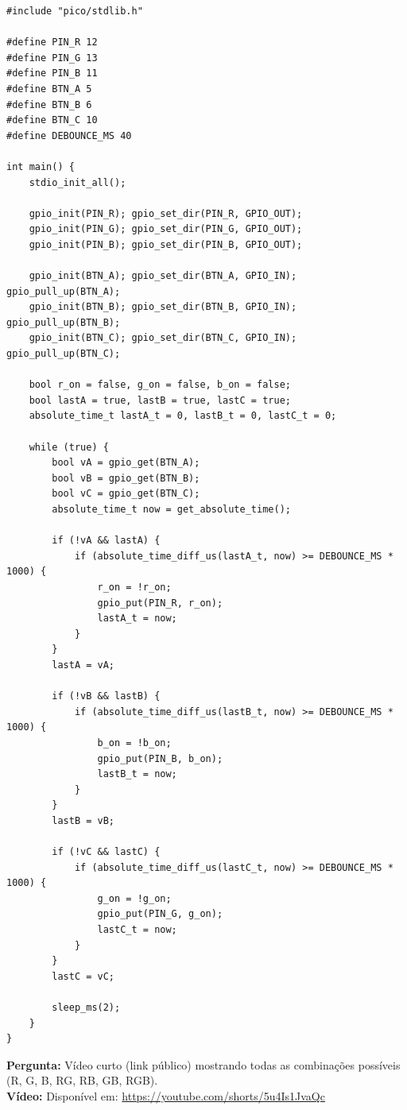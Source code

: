 \documentclass{article}
\begin{document}
\begin{lstlisting}[caption={Controle de LEDs com botões no Raspberry Pi Pico}]
#include "pico/stdlib.h"

#define PIN_R 12
#define PIN_G 13
#define PIN_B 11
#define BTN_A 5
#define BTN_B 6
#define BTN_C 10
#define DEBOUNCE_MS 40

int main() {
    stdio_init_all();

    gpio_init(PIN_R); gpio_set_dir(PIN_R, GPIO_OUT);
    gpio_init(PIN_G); gpio_set_dir(PIN_G, GPIO_OUT);
    gpio_init(PIN_B); gpio_set_dir(PIN_B, GPIO_OUT);

    gpio_init(BTN_A); gpio_set_dir(BTN_A, GPIO_IN); gpio_pull_up(BTN_A);
    gpio_init(BTN_B); gpio_set_dir(BTN_B, GPIO_IN); gpio_pull_up(BTN_B);
    gpio_init(BTN_C); gpio_set_dir(BTN_C, GPIO_IN); gpio_pull_up(BTN_C);

    bool r_on = false, g_on = false, b_on = false;
    bool lastA = true, lastB = true, lastC = true;
    absolute_time_t lastA_t = 0, lastB_t = 0, lastC_t = 0;

    while (true) {
        bool vA = gpio_get(BTN_A);
        bool vB = gpio_get(BTN_B);
        bool vC = gpio_get(BTN_C);
        absolute_time_t now = get_absolute_time();

        if (!vA && lastA) {
            if (absolute_time_diff_us(lastA_t, now) >= DEBOUNCE_MS * 1000) {
                r_on = !r_on;
                gpio_put(PIN_R, r_on);
                lastA_t = now;
            }
        }
        lastA = vA;

        if (!vB && lastB) {
            if (absolute_time_diff_us(lastB_t, now) >= DEBOUNCE_MS * 1000) {
                b_on = !b_on;
                gpio_put(PIN_B, b_on);
                lastB_t = now;
            }
        }
        lastB = vB;

        if (!vC && lastC) {
            if (absolute_time_diff_us(lastC_t, now) >= DEBOUNCE_MS * 1000) {
                g_on = !g_on;
                gpio_put(PIN_G, g_on);
                lastC_t = now;
            }
        }
        lastC = vC;

        sleep_ms(2);
    }
}
\end{lstlisting}


\noindent
\textbf{Pergunta:} Vídeo curto (link público) mostrando todas as combinações possíveis (R, G, B, RG, RB, GB, RGB). \\

\noindent
\textbf{Vídeo:} Disponível em: \url{https://youtube.com/shorts/5u4Is1JvaQc}
\end{document}
